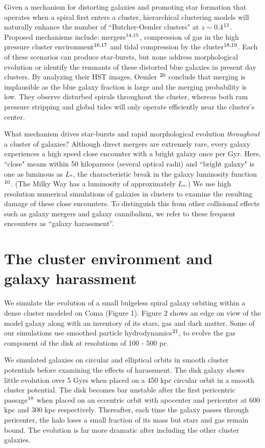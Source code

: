 Given a mechanism for distorting galaxies and promoting star formation
that operates when a spiral first enters a cluster, hierarchical
clustering models will naturally enhance the number of
``Butcher-Oemler clusters" at $z \sim 0.4$$^{\bf\rm 13}$. Proposed
mechanisms include: mergers$^{\bf\rm 14,15}$, compression of gas in
the high pressure cluster environment$^{\bf\rm 16,17}$ and tidal
compression by the cluster$^{\bf\rm 18,19}$.  Each of these scenarios
can produce star-bursts, but none address morphological evolution or
identify the remnants of these distorted blue galaxies in present day
clusters. By analyzing their HST images, Oemler \etal$^{\bf\rm 20}$
conclude that merging is implausible as the blue galaxy fraction is
large and the merging probability is low.  They observe disturbed
spirals throughout the cluster, whereas both ram pressure stripping
and global tides will only operate efficiently near the cluster's
center.

What mechanism drives star-bursts and rapid morphological evolution
{\it throughout} a cluster of galaxies?  Although direct mergers are
extremely rare, every galaxy experiences a high speed close encounter
with a bright galaxy once per Gyr.  Here, ``close" means within 50
kiloparsecs (several optical radii) and ``bright galaxy" is one as
luminous as $L_*$, the characteristic break in the galaxy luminosity
function$^{\bf\rm 10}$.  (The Milky Way has a luminosity of
approximately $L_*$.)  We use high resolution numerical simulations of
galaxies in clusters to examine the resulting damage of these close
encounters.  To distinguish this from other collisional effects such
as galaxy mergers and galaxy cannibalism, we refer to these frequent
encounters as ``galaxy harassment''.

\section{The cluster environment and galaxy harassment}

We simulate  the evolution of a small
bulgeless spiral galaxy orbiting within a dense cluster modeled on Coma
(Figure 1).  Figure 2 shows an edge on view of the model galaxy along
with an inventory of its stars, gas and dark matter.  Some of our
simulations use smoothed particle hydrodynamics$^{\bf\rm 21}$,
to evolve the gas component of the disk at resolutions of 100 - 500 pc.

We simulated galaxies on circular and elliptical orbits in smooth
cluster potentials before examining the effects of harassment.  The
disk galaxy shows little evolution over 5 Gyrs when placed on a 450
kpc circular orbit in a smooth cluster potential.  The disk becomes
bar unstable after the first pericentric passage$^{\bf\rm 18}$ when
placed on an eccentric orbit with apocenter and pericenter at 600 kpc
and 300 kpc respectively.  Thereafter, each time the galaxy passes
through pericenter, the halo loses a small fraction of its mass but
stars and gas remain bound.  The evolution is far more dramatic after
including the other cluster galaxies.

